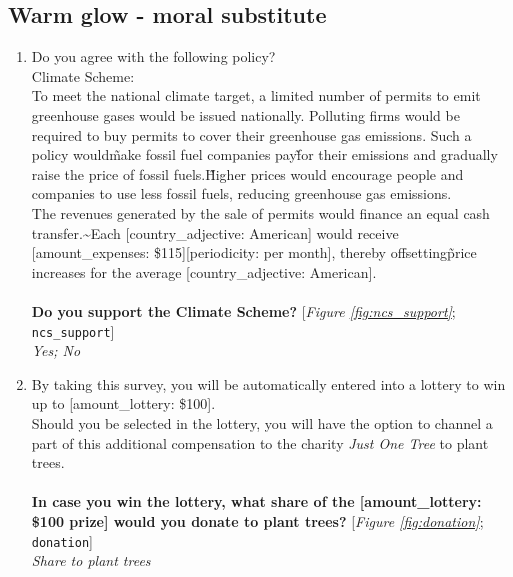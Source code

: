  \subsection*{Warm glow - moral substitute} 
 \begin{enumerate}[resume] 
\item  \label{q:ncs_support} Do you agree with the following policy?
\\
Climate Scheme:\~\\
To meet the national climate target, a limited number of permits to emit greenhouse gases would be issued nationally. Polluting firms would be required to buy permits to cover their greenhouse gas emissions. Such a policy would\~make fossil fuel companies pay\~for their emissions and gradually raise the price of fossil fuels.\~Higher prices would encourage people and companies to use less fossil fuels, reducing greenhouse gas emissions.\\
The revenues generated by the sale of permits would finance an equal cash transfer.\textbf{\~}Each [country\_adjective: American] would receive [amount\_expenses: \$115][periodicity: per month], thereby offsetting\~price increases for the average [country\_adjective: American].\\
\\
\textbf{Do you support the Climate Scheme?} [\textit{Figure \ref{fig:ncs_support}}; 
\verb|ncs_support|]
  \\ \textit{Yes; No}

\item  \label{q:donation} By taking this survey, you will be automatically entered into a lottery to win up to [amount\_lottery: \$100]. \\Should you be selected in the lottery, you will have the option to channel a part of this additional compensation to the charity \textit{Just One Tree} to plant trees.\\\\\textbf{In case you win the lottery, what share of the [amount\_lottery: \$100 prize] would you donate to plant trees?} [\textit{Figure \ref{fig:donation}}; 
\verb|donation|]
  \\ \textit{Share to plant trees}

\end{enumerate} 

